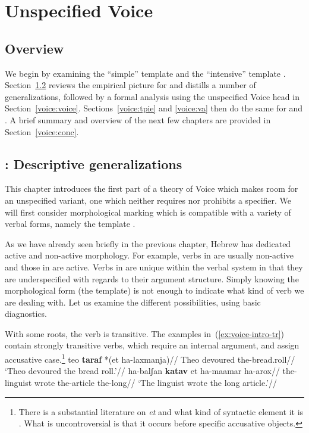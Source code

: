 \chapter{Unspecified Voice}
\label{chap:voice}

\section{Overview} \label{voice:intro}
We begin by examining the ``simple'' template {\tkal} and the ``intensive'' template {\tpie}. Section~\ref{voice:tkal} reviews the empirical picture for {\tkal} and distills a number of generalizations, followed by a formal analysis using the unspecified Voice head in Section~\ref{voice:voice}. Sections~\ref{voice:tpie} and \ref{voice:va} then do the same for {\tpie} and {\va}. A brief summary and overview of the next few chapters are provided in Section~\ref{voice:conc}.

\section{\tkal: Descriptive generalizations} \label{voice:tkal}
This chapter introduces the first part of a theory of Voice which makes room for an unspecified variant, one which neither requires nor prohibits a specifier. We will first consider morphological marking which is compatible with a variety of verbal forms, namely the template {\tkal}.

As we have already seen briefly in the previous chapter, Hebrew has dedicated active and non-active morphology. For example, verbs in {\tnif} are usually non-active and those in {\thif} are active. Verbs in {\tkal} are unique within the verbal system in that they are underspecified with regards to their argument structure. Simply knowing the morphological form (the template) is not enough to indicate what kind of verb we are dealing with. Let us examine the different possibilities, using basic diagnostics.

With some roots, the verb is transitive. The examples in~(\ref{ex:voice-intro-tr}) contain strongly transitive verbs, which require an internal argument, and assign accusative case.\footnote{There is a substantial literature on \emph{et} and what kind of syntactic element it is \citep{siloni97,danon01,borer13oup}. What is uncontroversial is that it occurs before specific accusative objects.}
\pex\label{ex:voice-intro-tr}
	\a \begingl
		\gla teo \textbf{taraf} *(et ha-laxmanja)//
		\glb Theo devoured  the-bread.roll//
		\glft `Theo devoured the bread roll.'//
	\endgl
	\a \begingl
		\gla ha-balʃan \textbf{katav} et ha-maamar ha-arox//
		\glb the-linguist wrote  the-article the-long//
		\glft `The linguist wrote the long article.'//
	\endgl
\xe

